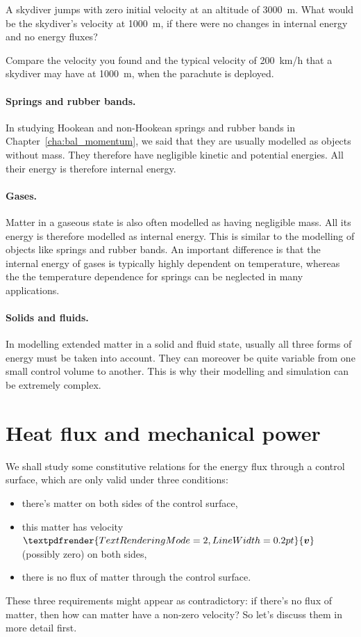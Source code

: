 \documentclass[a4paper,12pt,%
onecolumn,oneside,%
british%
]{memoir}
\renewcommand*{\bm}[1]{\textpdfrender{TextRenderingMode=2,LineWidth=0.2pt}{\boldsymbol{#1}}}
\renewcommand*{\|}[1][]{\nonscript\:#1\vert\nonscript\:\mathopen{}}
\newcommand*{\chap}{Chapter}%
\newcommand*{\yv}{\bm{v}}
\begin{document}
\begin{exercise}
  A skydiver jumps with zero initial velocity at an altitude of \qty{3000}{m}. What would be the skydiver's velocity at \qty{1000}{m}, if there were no changes in internal energy and no energy fluxes?

  \smallskip

  Compare the velocity you found and the typical velocity of \qty{200}{km/h} that a skydiver may have at \qty{1000}{m}, when the parachute is deployed.
\end{exercise}

\paragraph{Springs and rubber bands.}

In studying Hookean and non-Hookean springs and rubber bands in \chap~\ref{cha:bal_momentum}, we said that they are usually modelled as objects without mass. They therefore have negligible kinetic and potential energies. All their energy is therefore internal energy.

\paragraph{Gases.}
Matter in a gaseous state is also often modelled as having negligible mass. All its energy is therefore modelled as internal energy. This is similar to the modelling of objects like springs and rubber bands. An important difference is that the internal energy of gases is typically highly dependent on temperature, whereas the the temperature dependence for springs can be neglected in many applications.

\paragraph{Solids and fluids.}

In modelling extended matter in a solid and fluid state, usually all three forms of energy must be taken into account. They can moreover be quite variable from one small control volume to another. This is why their modelling and simulation can be extremely complex.

\section{Heat flux and mechanical power}
\label{sec:heating_power}

We shall study some constitutive relations for the energy flux through a control surface, which are only valid under three conditions:
\begin{itemize}[noitemsep]
\item there's matter on both sides of the control surface,
\item this matter has velocity $\yv$ (possibly zero) on both sides,
\item there is no flux of matter through the control surface.
\end{itemize}
These three requirements might appear as contradictory: if there's no flux of matter, then how can matter have a non-zero velocity? So let's discuss them in more detail first.
\end{document}

